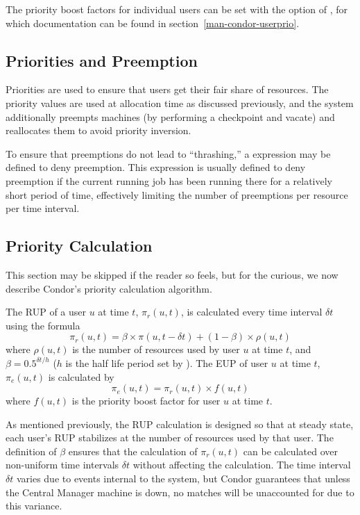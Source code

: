 The priority boost factors for individual users can be set with the 
 option of , for which documentation can
be found in section~\ref{man-condor-userprio}.

\subsection{Priorities and Preemption}
Priorities are used to ensure that users get their fair share of resources.  
The priority values are used at allocation time as discussed previously, and
the system additionally preempts machines (by performing a checkpoint and
vacate) and reallocates them to avoid priority inversion.

To ensure that preemptions do not lead to ``thrashing,'' a 
 expression may be defined to deny preemption.  This
expression is usually defined to deny preemption if the current running job
has been running there for a relatively short period of time, effectively
limiting the number of preemptions per resource per time interval.

\subsection{Priority Calculation}
This section may be skipped if the reader so feels, but for the curious,
we now describe Condor's priority calculation algorithm.

The RUP of a user $u$ at time $t$, $\pi_r(u,t)$, is calculated 
every time interval $\delta t$ using the formula 
$$\pi_r(u,t) = \beta\times\pi(u,t-\delta t) + (1-\beta)\times\rho(u,t)$$
where $\rho(u,t)$ is the number of resources used by user $u$ at time $t$,
and $\beta=0.5^{{\delta t}/h}$ ($h$ is the half life period set by 
).  The EUP of user $u$ at time $t$, $\pi_e(u,t)$
is calculated by
$$\pi_e(u,t) = \pi_r(u,t)\times f(u,t)$$
where $f(u,t)$ is the priority boost factor for user $u$ at time $t$.

As mentioned previously, the RUP calculation is designed so that at steady
state, each user's RUP stabilizes at the number of resources used by that user. 
The definition of $\beta$ ensures that the calculation of $\pi_r(u,t)$ can be 
calculated over non-uniform time intervals $\delta t$ without affecting the 
calculation.  The time interval $\delta t$ varies due to events internal to 
the system, but Condor guarantees that unless the Central Manager machine is 
down, no matches will be unaccounted for due to this variance.
